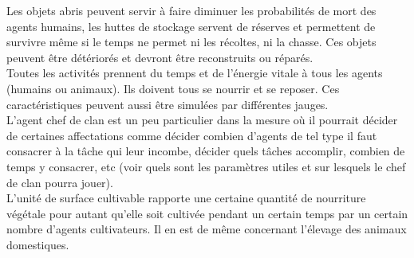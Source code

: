 \documentclass[12pt]{article}
\begin{document}
Les objets abris peuvent servir à faire diminuer les probabilités de mort des agents humains, les huttes de stockage servent de réserves et permettent de survivre même si le temps ne permet ni les récoltes, ni la chasse. Ces objets peuvent être détériorés et devront être reconstruits ou réparés.\\

Toutes les activités prennent du temps et de l'énergie vitale à tous les agents (humains ou animaux). Ils doivent tous se nourrir et se reposer. Ces caractéristiques peuvent aussi être simulées par différentes jauges.\\

L'agent chef de clan est un peu particulier dans la mesure où il pourrait décider de certaines affectations comme décider combien d'agents de tel type il faut consacrer à la tâche qui leur incombe, décider quels tâches accomplir, combien de temps y consacrer, etc (voir quels sont les paramètres utiles et sur lesquels le chef de clan pourra jouer).\\

L'unité de surface cultivable rapporte une certaine quantité de nourriture végétale pour autant qu'elle soit cultivée pendant un certain temps par un certain nombre d'agents cultivateurs. Il en est de même concernant l'élevage des animaux domestiques.\\

					
\end{document}
